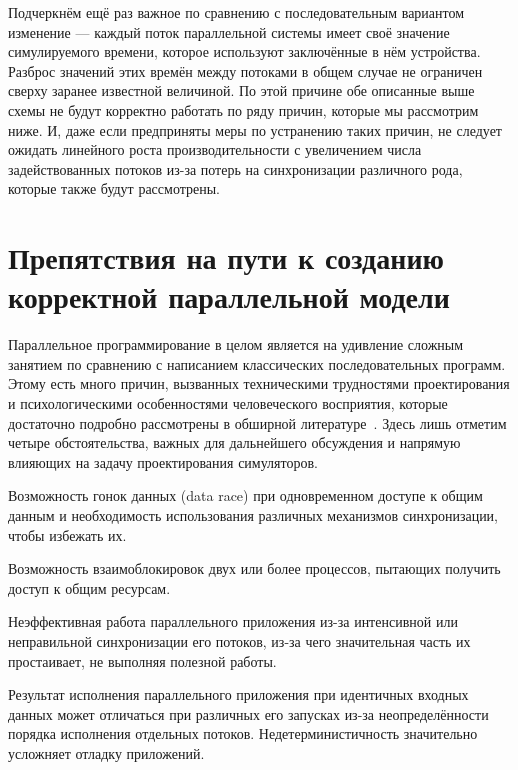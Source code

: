 Подчеркнём ещё раз важное по сравнению с последовательным вариантом изменение — каждый поток параллельной системы имеет своё значение симулируемого времени, которое используют заключённые в нём устройства. Разброс значений этих времён между потоками в общем случае не ограничен сверху заранее известной величиной. По этой причине обе описанные выше схемы не будут корректно работать по ряду причин, которые мы рассмотрим ниже. И, даже если предприняты меры по устранению таких причин, не следует ожидать линейного роста производительности с увеличением числа задействованных потоков из-за потерь на синхронизации различного рода, которые также будут рассмотрены.

\section[Препятствия параллельной модели]{Препятствия на пути к созданию корректной параллельной модели}

Параллельное программирование в целом является на удивление сложным занятием по сравнению с написанием классических последовательных программ. Этому есть много причин, вызванных техническими трудностями проектирования и психологическими особенностями человеческого восприятия, которые достаточно подробно рассмотрены в обширной литературе~\cite{Herlihy:2008:AMP:1734069, toporkov2004, Andrews:1999:FPD:519301}. Здесь лишь отметим четыре обстоятельства, важных для дальнейшего обсуждения и напрямую влияющих на задачу проектирования симуляторов.

\begin{enumerate*}
    \item Возможность гонок данных (\abbr data race) при одновременном доступе к общим данным и необходимость использования различных механизмов синхронизации, чтобы избежать их.
    \item Возможность взаимоблокировок двух или более процессов, пытающих получить доступ к общим ресурсам.
    \item Неэффективная работа параллельного приложения из-за интенсивной или неправильной синхронизации его потоков, из-за чего значительная часть их простаивает, не выполняя полезной работы.
    \item Результат исполнения параллельного приложения при идентичных входных данных может отличаться при различных его запусках из-за неопределённости порядка исполнения отдельных потоков. Недетерминистичность значительно усложняет отладку приложений.
\end{enumerate*}

